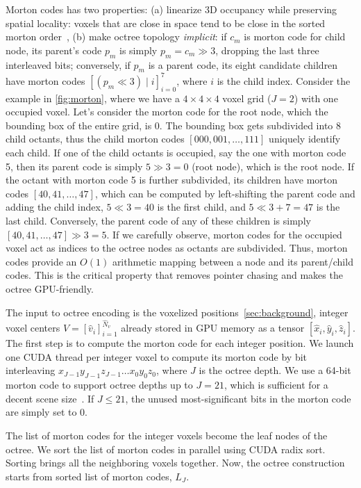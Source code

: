 Morton codes has two properties: (a) linearize 3D occupancy while preserving spatial locality: voxels that are close in space tend to be close in the sorted morton order~\cite{morton-code-spc}, (b) make octree topology \emph{implicit}: if $c_m$ is morton code for child node, its parent's code $p_m$ is simply $p_m = c_m \gg 3$, \ie dropping the last three interleaved bits; conversely, if $p_m$ is a parent code, its eight candidate children have morton codes $[(p_m \ll 3) \;|\; i]_{i=0}^7$, where $i$ is the child index.
%
Consider the example in \cref{fig:morton}, where we have a $4\times4\times4$ voxel grid ($J=2$) with one occupied voxel.
%
Let's consider the morton code for the root node, which the bounding box of the entire grid, is 0. 
%
The bounding box gets subdivided into 8 child octants, thus the child morton codes $[000,001,\ldots,111]$ uniquely identify each child.
%
If one of the child octants is occupied, say the one with morton code 5, then its parent code is simply $5 \gg 3 = 0$ (root node), which is the root node.
%
If the octant with morton code 5 is further subdivided, its children have morton codes $[40,41,\ldots,47]$, which can be computed by left-shifting the parent code and adding the child index, \ie $5 \ll 3 = 40$ is the first child, and $5 \ll 3 + 7 = 47$ is the last child.
%
Conversely, the parent code of any of these children is simply $[40,41,\ldots,47] \gg 3 = 5$.
%
If we carefully observe, morton codes for the occupied voxel act as indices to the octree nodes as octants are subdivided.
%
Thus, morton codes provide an $O(1)$ arithmetic mapping between a node and its parent/child codes.
%
This is the critical property that removes pointer chasing and makes the octree GPU-friendly.

%
The input to octree encoding is the voxelized \gs positions~\ref{sec:background}, \ie integer voxel centers $\hat{V}=[\hat{v}_i]_{i=1}^{\hat{N}_v}$ already stored in GPU memory as a tensor $[\hat{x}_i,\hat{y}_i,\hat{z}_i]$.
%
The first step is to compute the morton code for each integer position.
%
We launch one CUDA thread per integer voxel to compute its morton code by bit interleaving $x_{J-1}y_{J-1}z_{J-1}\ldots x_0y_0z_0$, where $J$ is the octree depth.
%
We use a 64-bit morton code to support octree depths up to $J=21$, which is sufficient for a decent scene size~\cite{mesongs}.
%
If $J\leq 21$, the unused most-significant bits in the morton code are simply set to 0.

The list of morton codes for the integer voxels become the leaf nodes of the octree.
%
We sort the list of morton codes in parallel using CUDA radix sort.
%
Sorting brings all the neighboring voxels together.
%
Now, the octree construction starts from sorted list of morton codes, $L_J$.

